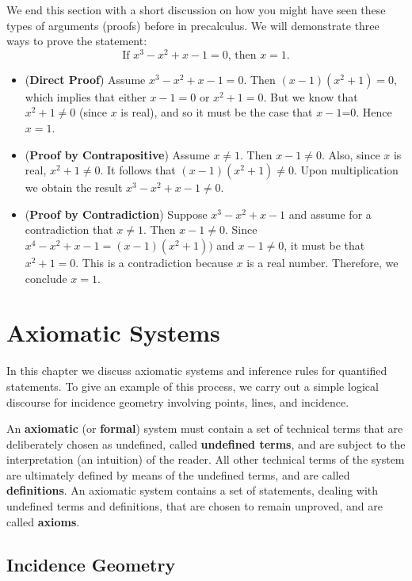 \documentclass[
  letterpaper,
  10pt,
  reqno,
  twopage,
  openany]{book}
\providecommand{\tightlist}{%
  \setlength{\itemsep}{0pt}\setlength{\parskip}{0pt}}\usepackage{longtable,booktabs,array}
\theoremstyle{plain}
\theoremstyle{definition}
\theoremstyle{definition}
\theoremstyle{definition}
\theoremstyle{plain}
\theoremstyle{plain}
\theoremstyle{remark}
\begin{document}
We end this section with a short discussion on how you might have seen
these types of arguments (proofs) before in precalculus. We will
demonstrate three ways to prove the statement: \[
\text{If  $x^3-x^2+x-1=0$, then $x=1$.}
\]

\begin{itemize}
\tightlist
\item
  (\textbf{Direct Proof}) Assume \(x^3-x^2+x-1=0\). Then
  \((x-1)(x^2+1)=0\), which implies that either \(x-1=0\) or
  \(x^2+1=0\). But we know that \(x^2+1\neq 0\) (since \(x\) is real),
  and so it must be the case that \(x-1\)=0. Hence \(x=1\).
\item
  (\textbf{Proof by Contrapositive}) Assume \(x\neq 1\). Then
  \(x-1\neq 0\). Also, since \(x\) is real, \(x^2+1\neq 0\). It follows
  that \((x-1)(x^2+1)\neq 0\). Upon multiplication we obtain the result
  \(x^3-x^2+x-1\neq 0\).
\item
  (\textbf{Proof by Contradiction}) Suppose \(x^3-x^2+x-1\) and assume
  for a contradiction that \(x\neq 1\). Then \(x-1\neq 0\). Since
  \(x^4-x^2+x-1=(x-1)(x^2+1))\) and \(x-1\neq 0\), it must be that
  \(x^2+1=0\). This is a contradiction because \(x\) is a real number.
  Therefore, we conclude \(x=1\).
\end{itemize}

\hypertarget{axiomatic-systems}{%
\section{Axiomatic Systems}\label{axiomatic-systems}}

In this chapter we discuss axiomatic systems and inference rules for
quantified statements. To give an example of this process, we carry out
a simple logical discourse for incidence geometry involving points,
lines, and incidence.

An  \textbf{axiomatic} (or 
\textbf{formal}) system must contain a set of technical terms that are
deliberately chosen as undefined, called 
\textbf{undefined terms}, and are subject to the interpretation (an
intuition) of the reader. All other technical terms of the system are
ultimately defined by means of the undefined terms, and are called
 \textbf{definitions}. An axiomatic system contains a
set of statements, dealing with undefined terms and definitions, that
are chosen to remain unproved, and are called 
\textbf{axioms}.

\hypertarget{incidence-geometry}{%
\subsection{Incidence Geometry}\label{incidence-geometry}}
\end{document}
